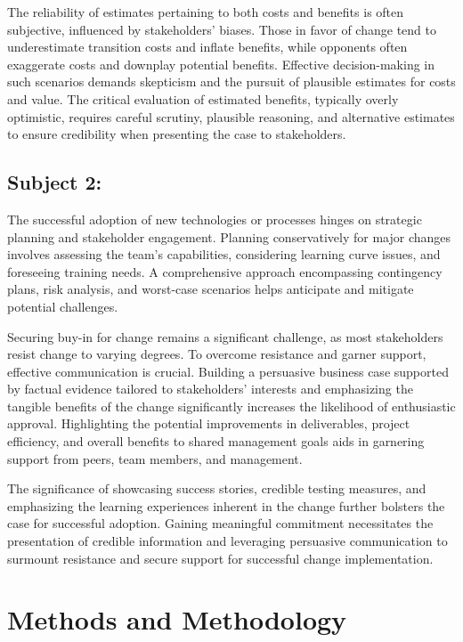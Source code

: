 \documentclass[11pt,letterpaper]{report}
\begin{document}
The reliability of estimates pertaining to both costs and benefits is often subjective, influenced by stakeholders' biases. Those in favor of change tend to underestimate transition costs and inflate benefits, while opponents often exaggerate costs and downplay potential benefits. Effective decision-making in such scenarios demands skepticism and the pursuit of plausible estimates for costs and value. The critical evaluation of estimated benefits, typically overly optimistic, requires careful scrutiny, plausible reasoning, and alternative estimates to ensure credibility when presenting the case to stakeholders.

\section{Subject 2:}
\item {}
The successful adoption of new technologies or processes hinges on strategic planning and stakeholder engagement. Planning conservatively for major changes involves assessing the team's capabilities, considering learning curve issues, and foreseeing training needs. A comprehensive approach encompassing contingency plans, risk analysis, and worst-case scenarios helps anticipate and mitigate potential challenges.

Securing buy-in for change remains a significant challenge, as most stakeholders resist change to varying degrees. To overcome resistance and garner support, effective communication is crucial. Building a persuasive business case supported by factual evidence tailored to stakeholders' interests and emphasizing the tangible benefits of the change significantly increases the likelihood of enthusiastic approval. Highlighting the potential improvements in deliverables, project efficiency, and overall benefits to shared management goals aids in garnering support from peers, team members, and management.

The significance of showcasing success stories, credible testing measures, and emphasizing the learning experiences inherent in the change further bolsters the case for successful adoption. Gaining meaningful commitment necessitates the presentation of credible information and leveraging persuasive communication to surmount resistance and secure support for successful change implementation.

\chapter{Methods and Methodology}
\end{document}
